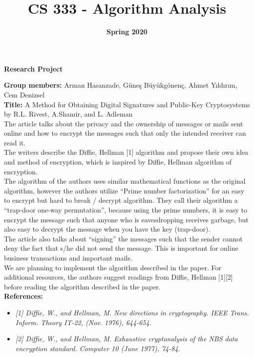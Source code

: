 \documentclass[11pt]{article}
\title{\huge\textbf{CS 333 - Algorithm Analysis}}
\date{\Large\textbf{Spring 2020}}
\begin{document}
\maketitle
\begin{center}
\LARGE\textbf{Research Project}
\\[2\baselineskip]
\end{center}
\setlength{\parindent}{0em}
\textbf{Group members:} Arman Hasanzade, Güneş Büyükgönenç, Ahmet Yıldırım, Cem Denizsel
\\[1\baselineskip]
\textbf{Title:} A Method for Obtaining Digital Signatures and Public-Key Cryptosystems by R.L. Rivest, A.Shamir, and L. Adleman
\\[2\baselineskip]
The article talks about the privacy and the ownership of messages or mails sent online and how to encrypt the messages such that only the intended receiver can read it.\\
The writers describe the Diffie, Hellman [1] algorithm and propose their own idea and method of encryption, which is inspired by Diffie, Hellman algorithm of encryption.\\
The algorithm of the authors uses similar mathematical functions as the original algorithm, however the authors utilize “Prime number factorization” for an easy to encrypt but hard to break / decrypt algorithm.
They call their algorithm a “trap-door one-way permutation”, because using the prime numbers, it is easy to encrypt the message such that anyone who is eavesdropping receives garbage, but also easy to decrypt the message when you have the key (trap-door).\\
The article also talks about “signing” the messages such that the sender cannot deny the fact that s/he did not send the message. This is important for online business transactions and important mails.
\\[1em]
We are planning to implement the algorithm described in the paper. For additional resources, the authors suggest readings from Diffie, Hellman [1][2] before reading the algorithm described in the paper.
\\[5\baselineskip]
\textbf{References:}
\begin{itemize}
	\item \textit{[1] Diffie, W., and Hellman, M. New directions in cryptography. IEEE Trans. Inform. Theory IT-22, (Nov. 1976), 644-654.}
	\item \textit{[2] Diffie, W., and Hellman, M. Exhaustive cryptanalysis of the NBS data encryption standard. Computer 10 (June 1977), 74-84.}
\end{itemize}
\end{document}
